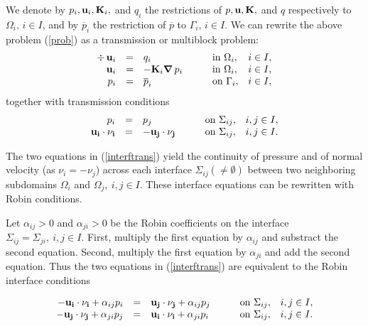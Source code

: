 \documentclass{article}
\newcommand{\ovl}{\overline}
\newcommand{\nab}{\mbox{\boldmath $\nabla$}}
\begin{document}
We denote by $p_i,{\bf u}_i,{\bf K}_i,$ and $q_i$ the restrictions of $p,{\bf
  u},{\bf K},$ and $q$ respectively to $\Omega_{i},\, i \in I$, and by
$\ovl{p}_i$ the restriction of $\ovl{p}$ to $\Gamma_i,\, i \in I$.  We can
rewrite the above problem (\ref{prob}) as a transmission or multiblock problem:
\begin{equation}\label{probt}\begin{array}{rllll}
\div \,{\bf u}_i &=& q_i &\qquad\mbox{in }\Omega_{i},&i \in I,\\
{\bf u}_i &=& -{\bf K}_i\nab\,p_i &\qquad\mbox{in }\Omega_{i},&i \in I,\\
p_i &=& \ovl{p}_i &\qquad\mbox{on }\Gamma_{i},&i \in I,
\end{array}\end{equation}
together with transmission conditions
\begin{equation}\label{interftrans}\begin{array}{rllll}
p_i &=& p_j &\qquad\mbox{on }\Sigma_{ij},&i,j \in I,\\
{\bf u_i \cdot  \nu_i} &=& - {\bf u_j \cdot \nu_j}
          &\qquad\mbox{on }\Sigma_{ij},&i,j \in I.\\ 
\end{array}\end{equation}

The two equations in (\ref{interftrans}) yield the continuity of pressure and of normal 
velocity (as $\nu_i = -\nu_j$) across each interface $\Sigma_{ij} (\neq \emptyset)$ 
between two neighboring subdomains 
$\Omega_i$ and $\Omega_j, \ i,j \in I$. These interface equations can be rewritten 
with Robin conditions. 

Let $\alpha_{ij} > 0$ and $\alpha_{ji} > 0$ be the
Robin coefficients on the interface $\Sigma_{ij} = \Sigma_{ji} , \ i,j \in I$. 
First, multiply the first equation by $\alpha_{ij}$ and substract the second equation. 
Second, multiply the first equation by $\alpha_{ji}$ and add the second equation. 
Thus the two equations in (\ref{interftrans}) are equivalent to the Robin
interface conditions 

\begin{equation}\label{interfrob}\begin{array}{rllll}
- {\bf u_i \cdot \nu_i}  + \alpha_{ij} p_i 
&=& 
{\bf u_j \cdot  \nu_j} + \alpha_{ij} p_j 
&\qquad\mbox{on }\Sigma_{ij},&i,j \in I,\\
- {\bf u_j \cdot  \nu_j} + \alpha_{ji} p_j 
&=& 
{\bf u_i \cdot  \nu_i}  + \alpha_{ji} p_i 
&\qquad\mbox{on }\Sigma_{ij},&i,j \in I.\\
\end{array}\end{equation}
\end{document}
